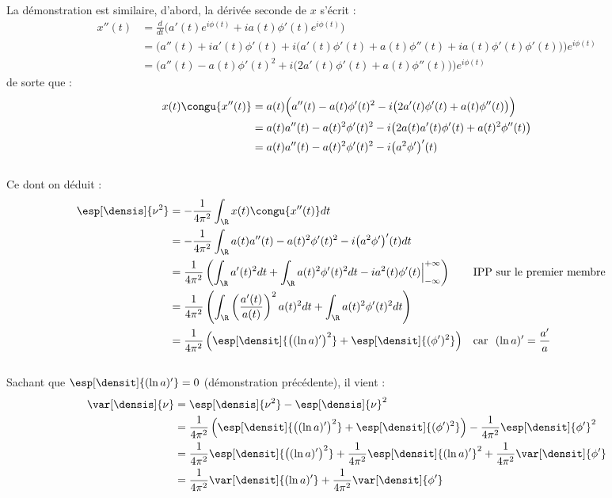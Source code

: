 \begin{annexe}
\begin{demo}
	La démonstration est similaire, d'abord, la dérivée seconde de $x$ s'écrit :
	\begin{align*}
		x''(t) &= \frac{d}{dt} \big( a'(t) e^{i\phi(t)} + ia(t)\phi'(t) e^{i\phi(t)} \big) \\
		&= \Big( a''(t) + ia'(t) \phi'(t) + i\big( a'(t)\phi'(t) + a(t)\phi''(t) + ia(t)\phi'(t)\phi'(t) \big) \Big) e^{i\phi(t)} \\
		&= \Big( a''(t) - a(t)\phi'(t)^2 + i\big( 2a'(t)\phi'(t) + a(t)\phi''(t)\big) \Big) e^{i\phi(t)}
	\end{align*}
	de sorte que :
	\begin{align*}
		x(t) \congu{x''(t)} &= a(t) \Big( a''(t) - a(t)\phi'(t)^2 - i\big( 2a'(t)\phi'(t) + a(t)\phi''(t)\big)\Big) \\
		&= a(t)a''(t) - a(t)^2\phi'(t)^2 - i\big( 2a(t)a'(t)\phi'(t) + a(t)^2\phi''(t)\big) \\
		&= a(t)a''(t) - a(t)^2\phi'(t)^2 - i \big( a^2\phi' \big)'(t)
	\end{align*}
	\\
	Ce dont on déduit :
	\begin{align*}
		\esp[\densis]{\nu^2} &= -\frac{1}{4\pi^2} \int_\R x(t) \congu{x''(t)} dt \\
		&= -\frac{1}{4\pi^2} \int_\R a(t)a''(t) - a(t)^2\phi'(t)^2 - i \big( a^2\phi' \big)'(t) dt \\
		&= \frac{1}{4\pi^2} \left( \int_\R a'(t)^2dt + \int_\R a(t)^2\phi'(t)^2 dt - i  a^2(t)\phi'(t)\Big|_{-\infty}^{+\infty} \right)  
			&  &\text{IPP sur le premier membre} \\
		&= \frac{1}{4\pi^2} \left( \int_\R \left(\frac{a'(t)}{a(t)}\right)^2 a(t)^2dt + \int_\R a(t)^2\phi'(t)^2 dt\right) \\
		&= \frac{1}{4\pi^2} \left( \esp[\densit]{\big((\ln a)'\big)^2}  + \esp[\densit]{(\phi')^2\Big.}\right)   &  &\text{car }\ (\ln a)' = \frac{a'}{a}
	\end{align*}
	\\
	Sachant que $\esp[\densit]{(\ln a)'}=0$ (\cf démonstration précédente), il vient :
	\begin{align*}
		\var[\densis]{\nu} &= \esp[\densis]{\nu^2} - \esp[\densis]{\nu}^2 \\
		&= \frac{1}{4\pi^2} \left( \esp[\densit]{\big((\ln a)'\big)^2}  + \esp[\densit]{(\phi')^2\Big.}\right)  - \frac{1}{4\pi^2} \esp[\densit]{\phi'}^2 \\
		&= \frac{1}{4\pi^2} \esp[\densit]{\big((\ln a)'\big)^2} + \frac{1}{4\pi^2}\esp[\densit]{(\ln a)'}^2 + \frac{1}{4\pi^2} \var[\densit]{\phi'\big.} \\
		&= \frac{1}{4\pi^2}\var[\densit]{(\ln a)'\big.} +\frac{1}{4\pi^2} \var[\densit]{\phi'\big.}
	\end{align*}
\end{demo}
\skipl


\end{annexe}
